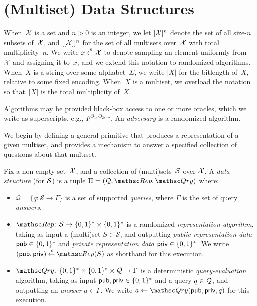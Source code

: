 \section{(Multiset) Data Structures}

 When~${\cal X}$ is a set and $n>0$ is an
integer, we let $[{\cal X}]^n$ denote the set of all size-$n$ subsets
of~${\cal X}$, and $[[{\cal X}]]^n$ for the set of all multisets
over~${\cal X}$ with total multiplicity~$n$.   We write $x {\:\stackrel{{\scriptscriptstyle \hspace{0.2em}\$}} {\leftarrow}\:} {\cal X}$ to denote
sampling an element uniformly from~${\cal X}$ and assigning it to~$x$,
and we extend this notation to randomized algorithms. When~$X$ is a
string over some alphabet~$\Sigma$, we write $|X|$ for the bitlength
of~$X$, relative to some fixed encoding.  When~$X$ is a multiset, we
overload the notation so that~$|X|$ is the total multiplicity
of~$X$.

Algorithms may be provided black-box access to one or more oracles,
which we write as superscripts, e.g., $F^{O_1,O_2,\ldots}$.  An \emph{adversary} is a randomized algorithm.

  We begin by defining a general primitive
that produces a representation of a given multiset, and provides a
mechanism to answer a specified collection of questions about that
multiset.
\begin{definition} \rm
Fix a non-empty set~${\cal X}$, and a collection of (multi)sets~${\cal S}$
over ${\cal X}$. A \emph{data structure} (for ${\cal S}$) is a tuple
$\setprim=(\calQ,\Rep, \Qry)$ where:
\begin{itemize}
\item $\mathcal{Q}=\{q \colon \mathcal{S} \to \Gamma\}$ is a set
    of supported \emph{queries}, where $\Gamma$ is the set of query \emph{answers}.
\item $\Rep \colon \mathcal{S} \to \bits^*
    \times \bits^*$ is a randomized \emph{representation
    algorithm}, taking as input a (multi)set $S \in \mathcal{S}$, and outputting %
    \emph{public representation data} ${\sf pub} \in \{0,1\}^*$ and
    \emph{private representation data} ${\sf priv} \in \{0,1\}^*$. We write
    $(\pubaux,\privaux) \getsr \Rep(S)$ as shorthand for this execution.
\item $\Qry\colon \bits^* \times \bits^* \times \calQ \to
    \Gamma$ is a deterministic \emph{query-evaluation}
    algorithm, taking as input ${\sf pub},{\sf priv} \in \{0,1\}^*$
    and a query $q \in {\cal Q}$, and outputting an \emph{answer}
    $a \in \Gamma$.  We write $a \gets \Qry(\pubaux,\privaux,q)$
    for this execution.
\end{itemize}
\hfill\dqed
\end{definition}

